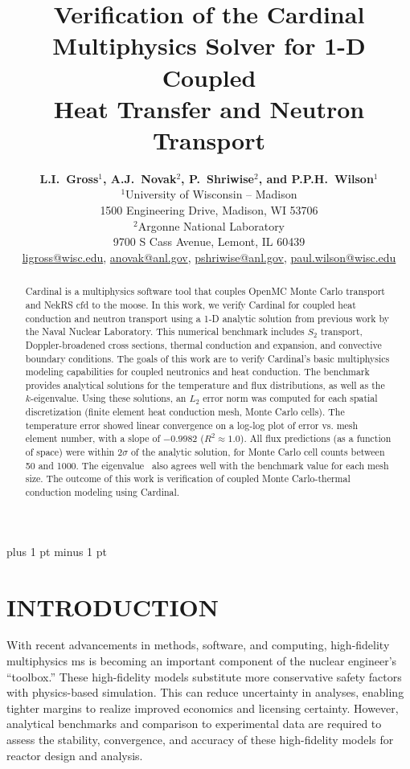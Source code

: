 \documentclass[letterpaper]{mc2023}
\title{Verification of the Cardinal Multiphysics Solver for 1-D Coupled\\
Heat Transfer and Neutron Transport}
\author{%
  \textbf{L.I.~Gross$^1$, A.J.~Novak$^2$, P.~Shriwise$^2$, and P.P.H.~Wilson$^1$}\\
  $^1$University of Wisconsin -- Madison  \\
  1500 Engineering Drive, Madison, WI 53706 \vspace{6pt}\\
  $^2$Argonne National Laboratory \\
  9700 S Cass Avenue, Lemont, IL 60439\vspace{6pt} \\
  \url{ligross@wisc.edu}, \url{anovak@anl.gov}, \url{pshriwise@anl.gov}, \url{paul.wilson@wisc.edu}
}
\begin{document}
\maketitle
\justify
\parskip 6pt plus 1 pt minus 1 pt

\begin{abstract}
Cardinal is a multiphysics software tool that couples OpenMC Monte Carlo transport and NekRS \gls{cfd} to the \gls{moose}.
In this work, we verify Cardinal for coupled heat conduction and neutron transport using a 1-D analytic solution from previous
work by the Naval Nuclear Laboratory. This numerical benchmark includes $S_2$ transport, Doppler-broadened cross sections,
thermal conduction and expansion, and convective boundary conditions. The goals of this work are to verify Cardinal's basic
multiphysics modeling capabilities for coupled neutronics and heat conduction. The benchmark provides analytical solutions for
the temperature and flux distributions, as well as the $k$-eigenvalue. Using these solutions, an $L_{2}$ error norm was computed
for each spatial discretization (finite element heat conduction mesh, Monte Carlo cells). The temperature error showed linear
convergence on a log-log plot of error vs. mesh element number, with a slope of $-0.9982$ ($R^2\approx 1.0$). All flux predictions (as a function of space)
were within $2\sigma$ of the analytic solution, for Monte Carlo cell counts between 50 and 1000. The eigenvalue \keff~also agrees
well with the benchmark value for each mesh size. The outcome of this work is verification of coupled Monte Carlo-thermal conduction
modeling using Cardinal.
\end{abstract}
\vspace{6pt}

\section{INTRODUCTION}
\label{sec:intro}
With recent advancements in methods, software, and computing, high-fidelity multiphysics \gls{ms} is becoming an important
component of the nuclear engineer's ``toolbox.'' These high-fidelity models substitute more conservative safety factors
with physics-based simulation. This can reduce uncertainty in analyses, enabling tighter margins to realize improved economics
and licensing certainty. However, analytical benchmarks and comparison to experimental data are required to assess the stability,
convergence, and accuracy of these high-fidelity models for reactor design and analysis.
\end{document}
